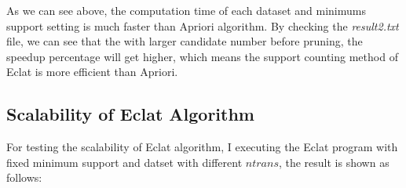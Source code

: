 \documentclass[a4paper, oneside, final, 12pt]{scrartcl} %
\begin{document}
As we can see above, the computation time of each dataset and minimums support setting
is much faster than Apriori algorithm. By checking the \emph{result2.txt} file,
we can see that the with larger candidate number before pruning,
the speedup percentage will get higher, which means the support counting method of Eclat
is more efficient than Apriori. \\

\subsection{Scalability of Eclat Algorithm}

For testing the scalability of Eclat algorithm, I executing the Eclat program with
fixed minimum support and datset with different $ntrans$, the result is shown as follows:

\newpage
\end{document}
